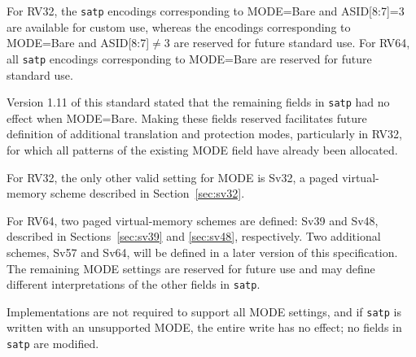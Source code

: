 For RV32, the {\tt satp} encodings corresponding to MODE=Bare and ASID[8:7]=3 are available
for custom use, whereas the encodings corresponding to MODE=Bare and ASID[8:7]$\ne$3 are
reserved for future standard use.
For RV64, all {\tt satp} encodings corresponding to MODE=Bare are reserved for future
standard use.

\begin{commentary}
Version 1.11 of this standard stated that the remaining fields in {\tt satp}
had no effect when MODE=Bare.
Making these fields reserved facilitates future definition of
additional translation and protection modes, particularly in RV32, for which
all patterns of the existing MODE field have already been allocated.
\end{commentary}

For RV32, the only other valid setting for MODE is Sv32, a paged
virtual-memory scheme described in Section~\ref{sec:sv32}.

For RV64, two paged virtual-memory schemes are defined: Sv39 and Sv48,
described in Sections~\ref{sec:sv39} and \ref{sec:sv48}, respectively.
Two additional schemes, Sv57 and Sv64, will be defined in a later version
of this specification.  The remaining MODE settings are reserved
for future use and may define different interpretations of the other fields in
{\tt satp}.

Implementations are not required to support all MODE settings,
and if {\tt satp} is written with an unsupported MODE, the entire write has
no effect; no fields in {\tt satp} are modified.

